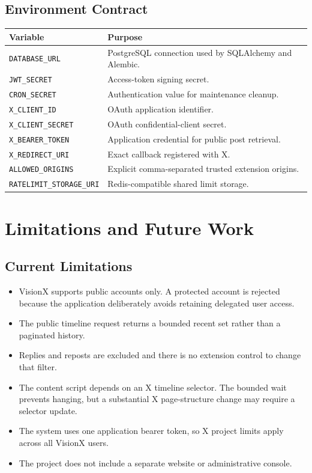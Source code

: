\documentclass[11pt,a4paper]{report}
\newcommand{\code}[1]{\texttt{#1}}
\begin{document}
\section{Environment Contract}
\begin{longtable}{L{0.31\textwidth} L{0.59\textwidth}}
\toprule
\textbf{Variable} & \textbf{Purpose} \\
\midrule
\endhead
\code{DATABASE\_URL} & PostgreSQL connection used by SQLAlchemy and Alembic. \\
\code{JWT\_SECRET} & Access-token signing secret. \\
\code{CRON\_SECRET} & Authentication value for maintenance cleanup. \\
\code{X\_CLIENT\_ID} & OAuth application identifier. \\
\code{X\_CLIENT\_SECRET} & OAuth confidential-client secret. \\
\code{X\_BEARER\_TOKEN} & Application credential for public post retrieval. \\
\code{X\_REDIRECT\_URI} & Exact callback registered with X. \\
\code{ALLOWED\_ORIGINS} & Explicit comma-separated trusted extension origins. \\
\code{RATELIMIT\_STORAGE\_URI} & Redis-compatible shared limit storage. \\
\bottomrule
\end{longtable}

\chapter{Limitations and Future Work}

\section{Current Limitations}
\begin{itemize}
  \item VisionX supports public accounts only. A protected account is rejected
  because the application deliberately avoids retaining delegated user access.
  \item The public timeline request returns a bounded recent set rather than a
  paginated history.
  \item Replies and reposts are excluded and there is no extension control to
  change that filter.
  \item The content script depends on an X timeline selector. The bounded wait
  prevents hanging, but a substantial X page-structure change may require a
  selector update.
  \item The system uses one application bearer token, so X project limits apply
  across all VisionX users.
  \item The project does not include a separate website or administrative
  console.
\end{itemize}
\end{document}
